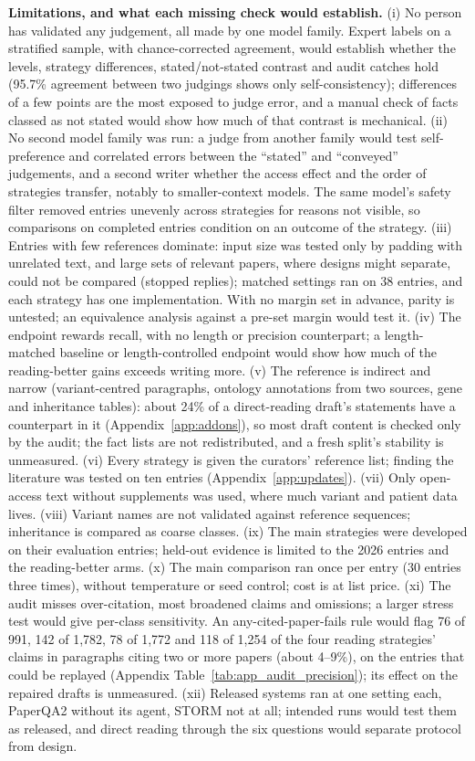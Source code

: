\documentclass{article} %
\begin{document}
\textbf{Limitations, and what each missing check would establish.} (i) No person has validated any judgement, all made by one model family. Expert labels on a stratified sample, with chance-corrected agreement, would establish whether the levels, strategy differences, stated/not-stated contrast and audit catches hold (95.7\% agreement between two judgings shows only self-consistency); differences of a few points are the most exposed to judge error, and a manual check of facts classed as not stated would show how much of that contrast is mechanical. (ii) No second model family was run: a judge from another family would test self-preference and correlated errors between the ``stated'' and ``conveyed'' judgements, and a second writer whether the access effect and the order of strategies transfer, notably to smaller-context models. The same model's safety filter removed entries unevenly across strategies for reasons not visible, so comparisons on completed entries condition on an outcome of the strategy. (iii) Entries with few references dominate: input size was tested only by padding with unrelated text, and large sets of relevant papers, where designs might separate, could not be compared (stopped replies); matched settings ran on 38 entries, and each strategy has one implementation. With no margin set in advance, parity is untested; an equivalence analysis against a pre-set margin would test it. (iv) The endpoint rewards recall, with no length or precision counterpart; a length-matched baseline or length-controlled endpoint would show how much of the reading-better gains exceeds writing more. (v) The reference is indirect and narrow (variant-centred paragraphs, ontology annotations from two sources, gene and inheritance tables): about 24\% of a direct-reading draft's statements have a counterpart in it (Appendix~\ref{app:addons}), so most draft content is checked only by the audit; the fact lists are not redistributed, and a fresh split's stability is unmeasured. (vi) Every strategy is given the curators' reference list; finding the literature was tested on ten entries (Appendix~\ref{app:updates}). (vii) Only open-access text without supplements was used, where much variant and patient data lives. (viii) Variant names are not validated against reference sequences; inheritance is compared as coarse classes. (ix) The main strategies were developed on their evaluation entries; held-out evidence is limited to the 2026 entries and the reading-better arms. (x) The main comparison ran once per entry (30 entries three times), without temperature or seed control; cost is at list price. (xi) The audit misses over-citation, most broadened claims and omissions; a larger stress test would give per-class sensitivity. An any-cited-paper-fails rule would flag 76 of 991, 142 of 1,782, 78 of 1,772 and 118 of 1,254 of the four reading strategies' claims in paragraphs citing two or more papers (about 4--9\%), on the entries that could be replayed (Appendix Table~\ref{tab:app_audit_precision}); its effect on the repaired drafts is unmeasured. (xii) Released systems ran at one setting each, PaperQA2 without its agent, STORM not at all; intended runs would test them as released, and direct reading through the six questions would separate protocol from design.
\end{document}
